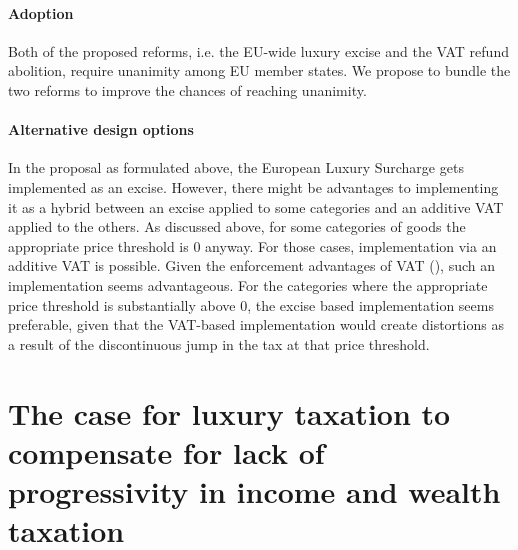 \documentclass{article}
\begin{document}
\paragraph{Adoption} %

Both of the proposed reforms, i.e. the EU-wide luxury excise and the VAT refund abolition, require unanimity among EU member states. We propose to bundle the two reforms to improve the chances of reaching unanimity.

\paragraph{Alternative design options}

In the proposal as formulated above, the European Luxury Surcharge gets implemented as an excise. However, there might be advantages to implementing it as a hybrid between an excise applied to some categories and an additive VAT applied to the others. As discussed above, for some categories of goods the appropriate price threshold is 0 anyway. For those cases, implementation via an additive VAT is possible. Given the enforcement advantages of VAT (\citet{pomeranz2015no}), such an implementation seems advantageous. For the categories where the appropriate price threshold is substantially above 0, the excise based implementation seems preferable, given that the VAT-based implementation would create distortions as a result of the discontinuous jump in the tax at that price threshold.   %







\section{The case for luxury taxation to compensate for lack of progressivity in income and wealth taxation}
\end{document}
